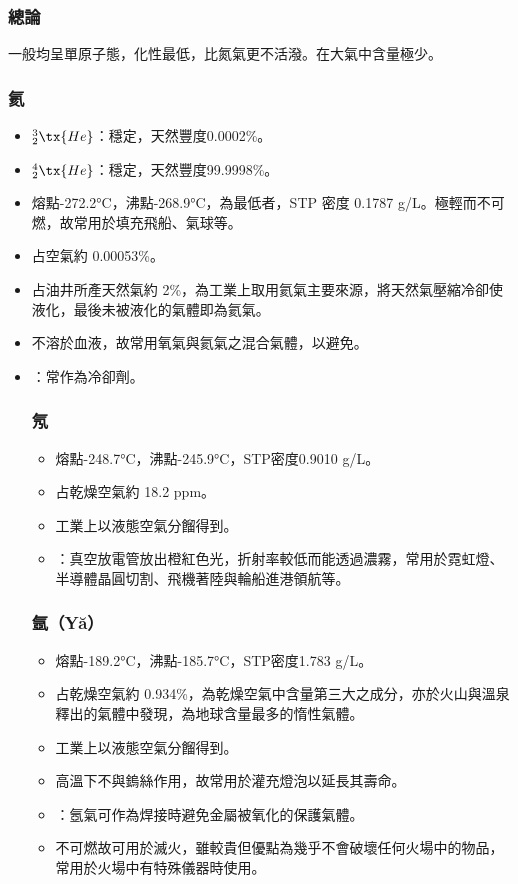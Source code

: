 \documentclass[a4paper,12pt]{report}
\begin{document}
\begin{itemize}
\subsubsection{總論}
一般均呈單原子態，化性最低，比氮氣更不活潑。在大氣中含量極少。
\subsubsection{氦}
\begin{itemize}
\item $^3_2\tx{He}$：穩定，天然豐度0.0002\%。
\item $^4_2\tx{He}$：穩定，天然豐度99.9998\%。
\item 熔點-272.2°C，沸點-268.9°C，為最低者，STP 密度 0.1787 g/L。極輕而不可燃，故常用於填充飛船、氣球等。
\item 占空氣約 0.00053\%。
\item 占油井所產天然氣約 2\%，為工業上取用氦氣主要來源，將天然氣壓縮冷卻使液化，最後未被液化的氣體即為氦氣。
\item 不溶於血液，故常用氧氣與氦氣之混合氣體，以避免。
\item {}：常作為冷卻劑。
\eit
\subsubsection{氖}
\begin{itemize}
\item 熔點-248.7°C，沸點-245.9°C，STP密度0.9010 g/L。
\item 占乾燥空氣約 18.2 ppm。
\item 工業上以液態空氣分餾得到。
\item {}：真空放電管放出橙紅色光，折射率較低而能透過濃霧，常用於霓虹燈、半導體晶圓切割、飛機著陸與輪船進港領航等。
\end{itemize}
\subsubsection{氬（Yă）}
\begin{itemize}
\item 熔點-189.2°C，沸點-185.7°C，STP密度1.783 g/L。
\item 占乾燥空氣約 0.934\%，為乾燥空氣中含量第三大之成分，亦於火山與溫泉釋出的氣體中發現，為地球含量最多的惰性氣體。
\item 工業上以液態空氣分餾得到。
\item 高溫下不與鎢絲作用，故常用於灌充燈泡以延長其壽命。
\item {}：氬氣可作為焊接時避免金屬被氧化的保護氣體。
\item 不可燃故可用於滅火，雖較貴但優點為幾乎不會破壞任何火場中的物品，常用於火場中有特殊儀器時使用。
\end{itemize}

\end{itemize}
\end{itemize}
\end{document}
